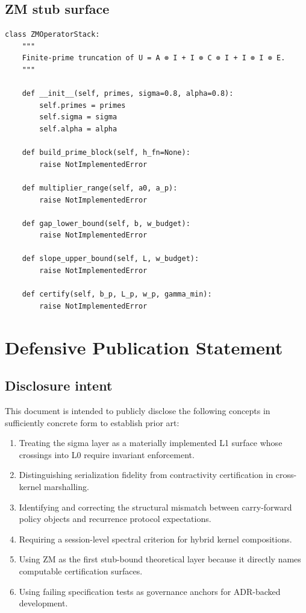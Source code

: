 \documentclass[11pt]{article}
\begin{document}
\subsection{ZM stub surface}

\begin{lstlisting}[style=py,caption={Proposed ZM-first stub binding}]
class ZMOperatorStack:
    """
    Finite-prime truncation of U = A ⊗ I + I ⊗ C ⊗ I + I ⊗ I ⊗ E.
    """

    def __init__(self, primes, sigma=0.8, alpha=0.8):
        self.primes = primes
        self.sigma = sigma
        self.alpha = alpha

    def build_prime_block(self, h_fn=None):
        raise NotImplementedError

    def multiplier_range(self, a0, a_p):
        raise NotImplementedError

    def gap_lower_bound(self, b, w_budget):
        raise NotImplementedError

    def slope_upper_bound(self, L, w_budget):
        raise NotImplementedError

    def certify(self, b_p, L_p, w_p, gamma_min):
        raise NotImplementedError
\end{lstlisting}

\section{Defensive Publication Statement}

\subsection{Disclosure intent}

This document is intended to publicly disclose the following concepts in sufficiently concrete form to establish prior art:

\begin{enumerate}[label=\arabic*.]
\item Treating the sigma layer as a materially implemented L1 surface whose crossings into L0 require invariant enforcement.
\item Distinguishing serialization fidelity from contractivity certification in cross-kernel marshalling.
\item Identifying and correcting the structural mismatch between carry-forward policy objects and recurrence protocol expectations.
\item Requiring a session-level spectral criterion for hybrid kernel compositions.
\item Using ZM as the first stub-bound theoretical layer because it directly names computable certification surfaces.
\item Using failing specification tests as governance anchors for ADR-backed development.
\end{enumerate}
\end{document}
